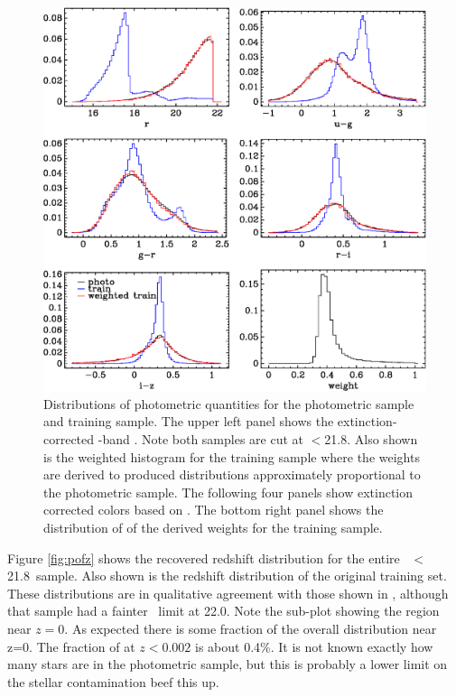 \documentclass{emulateapj}
\newcommand{\rmax}{21.8}
\begin{document}
\begin{figure}[p] \centering
    \includegraphics{figures/zweight-10-varhist.eps}

    \caption{Distributions of photometric quantities for the photometric sample
    and training sample.  The upper left panel shows the extinction-corrected
    \rmag-band \cmodelmag.  Note both samples are cut at \rmag$ < $\rmax.  
    Also shown is the weighted histogram for the training sample where
    the weights are derived to produced distributions approximately 
    proportional to the photometric sample.
    The following four panels show extinction corrected colors based on
    \modelmag.  The bottom right panel shows the distribution of of the
    derived weights for the training sample. }
    \label{fig:varhist}

    \vspace{2em}
\end{figure}

Figure \ref{fig:pofz} shows the recovered redshift distribution for the entire
\rmag\ $<$ \rmax\ sample.  Also shown is the redshift distribution of the
original training set.  These distributions are in qualitative agreement with
those shown in \citet{CunhaPhotoz09}, although that sample had a fainter \rmag\
limit at 22.0.  Note the sub-plot showing the region near $z=0$.  As expected
there is some fraction of the overall distribution near z=0.  The fraction of
at $z < 0.002$ is about 0.4\%.  It is not known exactly how many stars are in
the photometric sample, but this is probably a lower limit on the stellar
contamination {\color{red}beef this up}.
\end{document}
